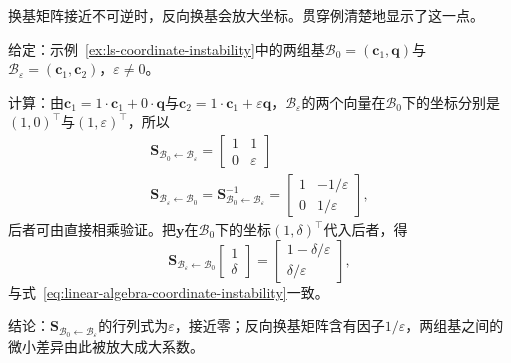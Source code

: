 换基矩阵接近不可逆时，反向换基会放大坐标。贯穿例清楚地显示了这一点。
\begin{example}[近共线基之间的换基]
\label{ex:ls-nearly-collinear-change-of-basis}
给定：示例~\ref{ex:ls-coordinate-instability}中的两组基$\mathcal B_0=(\bm c_1,\bm q)$与$\mathcal B_\varepsilon=(\bm c_1,\bm c_2)$，$\varepsilon\neq0$。

计算：由$\bm c_1=1\cdot\bm c_1+0\cdot\bm q$与$\bm c_2=1\cdot\bm c_1+\varepsilon\bm q$，$\mathcal B_\varepsilon$的两个向量在$\mathcal B_0$下的坐标分别是$(1,0)^{\top}$与$(1,\varepsilon)^{\top}$，所以
\[
\begin{gathered}
\bm S_{\mathcal B_0\leftarrow\mathcal B_\varepsilon}
 =\begin{bmatrix}1&1\\0&\varepsilon\end{bmatrix}\\
\bm S_{\mathcal B_\varepsilon\leftarrow\mathcal B_0}
 =\bm S_{\mathcal B_0\leftarrow\mathcal B_\varepsilon}^{-1}
 =\begin{bmatrix}1&-1/\varepsilon\\0&1/\varepsilon\end{bmatrix},
\end{gathered}
\]
后者可由直接相乘验证。把$\bm y$在$\mathcal B_0$下的坐标$(1,\delta)^{\top}$代入后者，得
\[
 \bm S_{\mathcal B_\varepsilon\leftarrow\mathcal B_0}\begin{bmatrix}1\\\delta\end{bmatrix}
 =\begin{bmatrix}1-\delta/\varepsilon\\\delta/\varepsilon\end{bmatrix},
\]
与式~\eqref{eq:linear-algebra-coordinate-instability}一致。

结论：$\bm S_{\mathcal B_0\leftarrow\mathcal B_\varepsilon}$的行列式为$\varepsilon$，接近零；反向换基矩阵含有因子$1/\varepsilon$，两组基之间的微小差异由此被放大成大系数。
\end{example}

